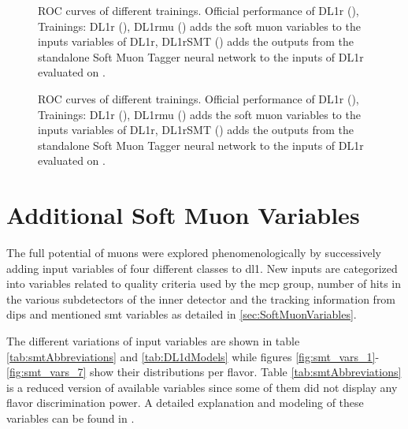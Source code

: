 \begin{figure}[]
  \centering
  \caption{ROC curves of different trainings. Official performance of DL1r (), Trainings: DL1r (), DL1rmu () adds the soft muon variables to the inputs variables of DL1r,  DL1rSMT () adds the outputs from the standalone Soft Muon Tagger neural network to the inputs of DL1r evaluated on \ttbar. }
  \label{fig:DL1rmu_vs_DL1r_SMT_tt}
\end{figure}

\begin{figure}[]
  \centering
  \caption{ROC curves of different trainings. Official performance of DL1r (), Trainings: DL1r (), DL1rmu () adds the soft muon variables to the inputs variables of DL1r,  DL1rSMT () adds the outputs from the standalone Soft Muon Tagger neural network to the inputs of DL1r evaluated on \Zprime. }
  \label{fig:DL1rmu_vs_DL1r_SMT_z}
\end{figure}



\section{Additional Soft Muon Variables}
The full potential of muons were explored phenomenologically by successively adding input variables of four different classes to \ac{dl1}. New inputs are categorized into variables related to quality criteria used by the \ac{mcp} group, number of hits in the various subdetectors of the inner detector and the tracking information from \ac{dips} and mentioned \ac{smt} variables as detailed in \ref{sec:SoftMuonVariables}.

The different variations of input variables are shown in table \ref{tab:smtAbbreviations} and \ref{tab:DL1dModels} while figures \ref{fig:smt_vars_1}-\ref{fig:smt_vars_7} show their distributions per flavor. Table \ref{tab:smtAbbreviations} is a reduced version of available variables since some of them did not display any flavor discrimination power. A detailed explanation and modeling of these variables can be found in \citep{Assamagan:1099953,Bugge:2665711}.


